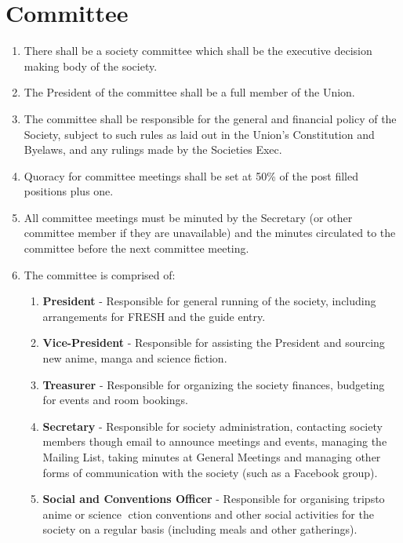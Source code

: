 \documentclass[a4paper,10pt]{article}
\begin{document}
\section{Committee}
\begin{enumerate}
  \item There shall be a society committee which shall be the executive decision making body of the society.
  \item The President of the committee shall be a full member of the Union.
  \item The committee shall be responsible for the general and financial policy of the Society, subject to such rules as laid out in the Union's Constitution and Byelaws, and any rulings made by the Societies Exec.
  \item Quoracy for committee meetings shall be set at 50\% of the post filled positions plus one.
  \item All committee meetings must be minuted by the Secretary (or other committee member if they are unavailable) and the minutes circulated to the committee before the next committee meeting.
  \item The committee is comprised of:
  \begin{enumerate}
    \item \textbf{President} - Responsible for general running of the society, including arrangements for FRESH and the guide entry.
    \item \textbf{Vice-President} - Responsible for assisting the President and sourcing new anime, manga and science fiction.
    \item \textbf{Treasurer} - Responsible for organizing the society finances, budgeting for events and room bookings.
    \item \textbf{Secretary} - Responsible for society administration, contacting society members though email to announce meetings and events, managing the Mailing List, taking minutes at General Meetings and managing other forms of communication with the society (such as a Facebook group).
    \item \textbf{Social and Conventions Officer} - Responsible for organising tripsto anime or science ction conventions and other social activities for the society on a regular basis (including meals and other gatherings).
  \end{enumerate}
\end{enumerate}
\end{document}
